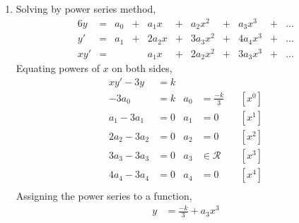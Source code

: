 \begin{enumerate}
    \item Solving by power series method,
          \begin{alignat}{6}
              y     & ={}      & a_0   & {}+{}    & a_1 x  &
              {}+{} & a_2 x^2  & {}+{} & a_3x^3   & {}+{}  & \dots \\
              y'    & ={}      & a_1   & {}+{}    & 2a_2 x &
              {}+{} & 3a_3 x^2 & {}+{} & 4a_4 x^3 & {}+{}  & \dots \\
              xy'   & ={}      &       &          & a_1 x  &
              {}+{} & 2a_2 x^2 & {}+{} & 3a_3 x^3 & {}+{}  & \dots
          \end{alignat}
          Equating powers of $ x $ on both sides,
          \begin{align}
              xy' -3y     & = k                         \\
              -3a_0       & = k             &
              a_0         & = \frac{-k}{3}  &   & [x^0] \\
              a_1 - 3a_1  & = 0             &
              a_1         & = 0             &   & [x^1] \\
              2a_2 - 3a_2 & = 0             &
              a_2         & = 0             &   & [x^2] \\
              3a_3 - 3a_3 & = 0             &
              a_3         & \in \mathcal{R} &   & [x^3] \\
              4a_4 - 3a_4 & = 0             &
              a_4         & = 0             &   & [x^4] \\
          \end{align}
          Assigning the power series to a function,
          \begin{align}
              y & = \frac{-k}{3} + a_3 x^3
          \end{align}


\end{enumerate}
